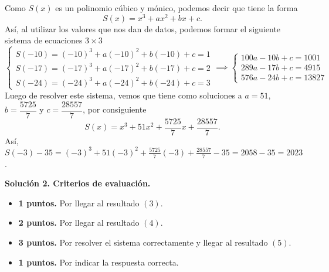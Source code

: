 \begin{solution}[2]
    Como $S(x)$ es un polinomio cúbico y mónico, podemos decir que tiene la forma
    \begin{equation}
        S(x) = x^3 + ax^2 + bx + c.
    \end{equation}
    Así, al utilizar los valores que nos dan de datos, podemos formar el siguiente sistema de ecuaciones $3 \times 3$
    \begin{equation}
        \begin{cases}
            S(-10) = (-10)^3 + a (-10)^2 + b (-10) + c = 1\\
            S(-17) = (-17)^3 + a (-17)^2 + b (-17) + c = 2\\
            S(-24) = (-24)^3 + a (-24)^2 + b (-24) + c = 3
        \end{cases}
        \implies
        \begin{cases}
            100a - 10b + c = 1001\\
            289a - 17b + c = 4915\\
            576a - 24b + c = 13827
        \end{cases}
    \end{equation}
    Luego de resolver este sistema, vemos que tiene como soluciones a    $a = 51$, $b = \dfrac{5725}{7}$ y $c = \dfrac{28557}{7}$, por consiguiente
    \begin{equation}
        S(x) = x^3 + 51x^2 + \frac{5725}{7}x + \frac{28557}{7}.
    \end{equation}
    Así, $S(-3) - 35 = (-3)^3 + 51(-3)^2 + \frac{5725}{7}(-3) + \frac{28557}{7} - 35 = 2058 - 35 = \boxed{2023}$.
\end{solution}

\textbf{Solución 2. Criterios de evaluación.}
\begin{itemize}
    \item \textbf{1 puntos.} Por llegar al resultado $(3)$.
    \item \textbf{2 puntos.} Por llegar al resultado $(4)$.
    \item \textbf{3 puntos.} Por resolver el sistema correctamente y llegar al resultado $(5)$.
    \item \textbf{1 puntos.} Por indicar la respuesta correcta.
\end{itemize}



